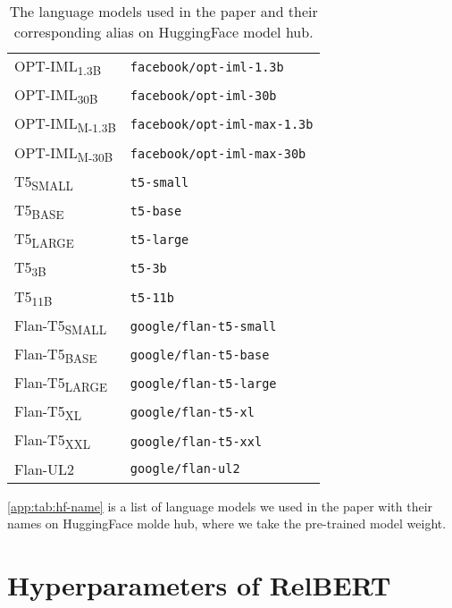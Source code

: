 \documentclass[3p]{elsarticle}
\begin{document}
{\begin{table}[ht]
\begin{tabular}{ll}
OPT-IML\textsubscript{1.3B}     &      \texttt{facebook/opt-iml-1.3b} \\
OPT-IML\textsubscript{30B}      &   \texttt{facebook/opt-iml-30b} \\
OPT-IML\textsubscript{M-1.3B} &  \texttt{facebook/opt-iml-max-1.3b} \\
OPT-IML\textsubscript{M-30B}      &   \texttt{facebook/opt-iml-max-30b} \\
T5\textsubscript{SMALL}         &                   \texttt{t5-small} \\
T5\textsubscript{BASE}          &                    \texttt{t5-base} \\
T5\textsubscript{LARGE}         &                   \texttt{t5-large} \\
T5\textsubscript{3B}            &                      \texttt{t5-3b} \\
T5\textsubscript{11B}           &                     \texttt{t5-11b} \\
Flan-T5\textsubscript{SMALL}    &       \texttt{google/flan-t5-small} \\
Flan-T5\textsubscript{BASE}     &        \texttt{google/flan-t5-base} \\
Flan-T5\textsubscript{LARGE}    &       \texttt{google/flan-t5-large} \\
Flan-T5\textsubscript{XL}       &          \texttt{google/flan-t5-xl} \\
Flan-T5\textsubscript{XXL}      &         \texttt{google/flan-t5-xxl} \\
Flan-UL2     &            \texttt{google/flan-ul2} \\
\bottomrule
\end{tabular}
\caption{The language models used in the paper and their corresponding alias on HuggingFace model hub.}
\label{app:tab:hf-name}
\end{table}

\autoref{app:tab:hf-name} is a list of language models we used in the paper with their names on HuggingFace molde hub, where we take the pre-trained model weight.

\section{Hyperparameters of RelBERT}
\label{app:hyperparameters}

}
\end{document}

